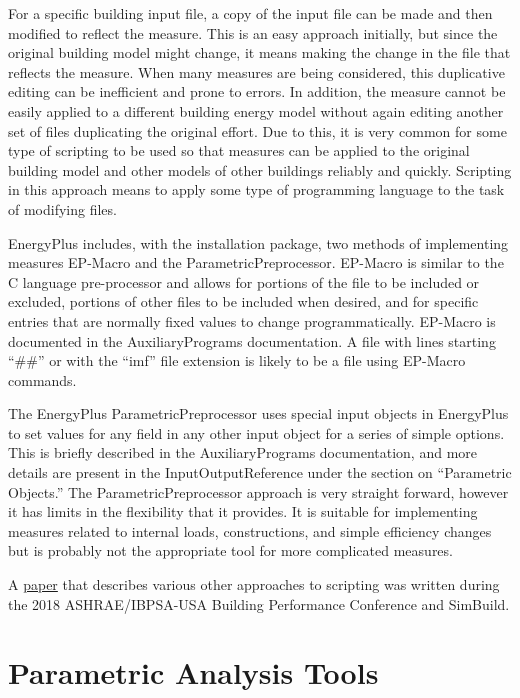 For a specific building input file, a copy of the input file can be
made and then modified to reflect the measure. This is an easy approach
initially, but since the original building model might change, it
means making the change in the file that reflects the measure. When
many measures are being considered, this duplicative editing can be
inefficient and prone to errors. In addition, the measure cannot be
easily applied to a different building energy model without again
editing another set of files duplicating the original effort. Due
to this, it is very common for some type of scripting to be used so
that measures can be applied to the original building model and other
models of other buildings reliably and quickly. Scripting in this
approach means to apply some type of programming language to the task
of modifying files.

EnergyPlus includes, with the installation package, two methods of
implementing measures EP-Macro and the ParametricPreprocessor. EP-Macro
is similar to the C language pre-processor and allows for portions
of the file to be included or excluded, portions of other files to
be included when desired, and for specific entries that are normally
fixed values to change programmatically. EP-Macro is documented in
the AuxiliaryPrograms documentation. A file with lines starting ``\#\#''
or with the ``imf'' file extension is likely to be a file using
EP-Macro commands.

The EnergyPlus ParametricPreprocessor uses special input objects in
EnergyPlus to set values for any field in any other input object for
a series of simple options. This is briefly described in the AuxiliaryPrograms
documentation, and more details are present in the InputOutputReference
under the section on ``Parametric Objects.'' The ParametricPreprocessor
approach is very straight forward, however it has limits in the flexibility
that it provides. It is suitable for implementing measures related
to internal loads, constructions, and simple efficiency changes but
is probably not the appropriate tool for more complicated measures.

A \href{https://www.ashrae.org/File\%20Library/Conferences/Specialty\%20Conferences/2018\%20Building\%20Performance\%20Analysis\%20Conference\%20and\%20SimBuild/Papers/C043.pdf}{paper}
that describes various other approaches to scripting was written during
the 2018 ASHRAE/IBPSA-USA Building Performance Conference and SimBuild.

\section{Parametric Analysis Tools }

